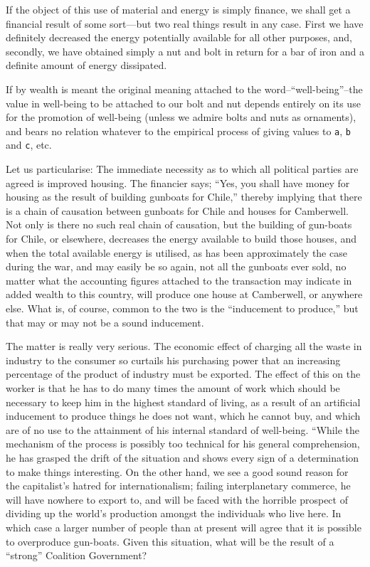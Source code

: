 \documentclass{book}
\newcommand\mdcode[1]{\texttt{#1}}
\begin{document}
If the object of this use of material and energy is simply finance, we shall get a financial result of some sort—but two real things result in any case. First we have definitely decreased the energy potentially available for all other purposes, and, secondly, we have obtained simply a nut and bolt in return for a bar of iron and a definite amount of energy dissipated.

If by wealth is meant the original meaning attached to the word–“well-being”–the value in well-being to be attached to our bolt and nut depends entirely on its use for the promotion of well-being (unless we admire bolts and nuts as ornaments), and bears no relation whatever to the empirical process of giving values to \mdcode{a}, \mdcode{b} and \mdcode{c}, etc.

Let us particularise: The immediate necessity as to which all political parties are agreed is improved housing. The financier says; “Yes, you shall have money for housing as the result of building gunboats for Chile,” thereby implying that there is a chain of causation between gunboats for Chile and houses for Camberwell. Not only is there no such real chain of causation, but the building of gun-boats for Chile, or elsewhere, decreases the energy available to build those houses, and when the total available energy is utilised, as has been approximately the case during the war, and may easily be so again, not all the gunboats ever sold, no matter what the accounting figures attached to the transaction may indicate in added wealth to this country, will produce one house at Camberwell, or anywhere else. What is, of course, common to the two is the “inducement to produce,” but that may or may not be a sound inducement.

The matter is really very serious. The economic effect of charging all the waste in industry to the consumer so curtails his purchasing power that an increasing percentage of the product of industry must be exported. The effect of this on the worker is that he has to do many times the amount of work which should be necessary to keep him in the highest standard of living, as a result of an artificial inducement to produce things he does not want, which he cannot buy, and which are of no use to the attainment of his internal standard of well-being. “While the mechanism of the process is possibly too technical for his general comprehension, he has grasped the drift of the situation and shows every sign of a determination to make things interesting. On the other hand, we see a good sound reason for the capitalist’s hatred for internationalism; failing interplanetary commerce, he will have nowhere to export to, and will be faced with the horrible prospect of dividing up the world’s production amongst the individuals who live here. In which case a larger number of people than at present will agree that it is possible to overproduce gun-boats. Given this situation, what will be the result of a “strong” Coalition Government?
\end{document}
